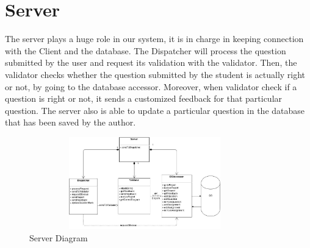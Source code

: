     \chapter{Server}
The server plays a huge role in our system, it is in charge in keeping connection with the Client and the database. The Dispatcher will process the question submitted by the user and request its validation with the validator. Then, the validator checks whether the question submitted by the student is actually right or not, by going to the database accessor. Moreover, when validator check if a question is right or not, it sends a customized feedback for that particular question.
The server also is able to update a particular question in the database that has been saved by the author. 

                        \begin{figure}[H]
            \centerline{\includegraphics[height=4cm, width=10cm]{Server.jpg}}
            \caption{Server Diagram}
    \end{figure}
    